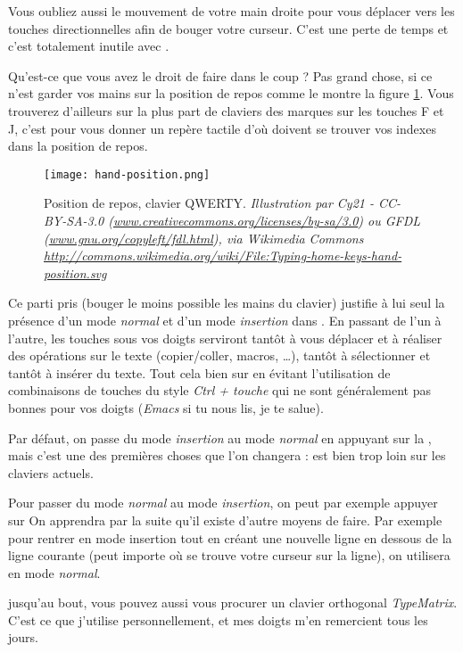 Vous oubliez aussi le mouvement de votre main droite pour vous déplacer vers les touches directionnelles afin de bouger votre curseur. C'est une perte de temps et c'est totalement inutile avec \vim.

Qu'est-ce que vous avez le droit de faire dans le coup ? Pas grand chose, si ce n'est garder vos mains sur la position de repos comme le montre la figure \ref{fig:hand-position}. Vous trouverez d'ailleurs sur la plus part de claviers des marques sur les touches F et J, c'est pour vous donner un repère tactile d'où doivent se trouver vos indexes dans la position de repos.

\begin{figure}%
  \texttt{[image: hand-position.png]}
  \caption{Position de repos, clavier QWERTY. \emph{Illustration par Cy21 - CC-BY-SA-3.0 (\url{www.creativecommons.org/licenses/by-sa/3.0}) ou GFDL (\url{www.gnu.org/copyleft/fdl.html}), via Wikimedia Commons \url{http://commons.wikimedia.org/wiki/File:Typing-home-keys-hand-position.svg}}}
  \label{fig:hand-position}
\end{figure}

Ce parti pris (bouger le moins possible les mains du clavier) justifie à lui seul la présence d'un mode \emph{normal} et d'un mode \emph{insertion} dans \vim. En passant de l'un à l'autre, les touches sous vos doigts serviront tantôt à vous déplacer et à réaliser des opérations sur le texte (copier/coller, macros, \ldots), tantôt à sélectionner et tantôt à insérer du texte. Tout cela bien sur en évitant l'utilisation de combinaisons de touches du style \emph{Ctrl + touche} qui ne sont généralement pas bonnes pour vos doigts (\emph{Emacs} si tu nous lis, je te salue).

Par défaut, on passe du mode \emph{insertion} au mode \emph{normal} en appuyant sur la \ttesc, mais c'est une des premières choses que l'on changera : \ttesc est bien trop loin sur les claviers actuels. 

Pour passer du mode \emph{normal} au mode \emph{insertion}, on peut par exemple appuyer sur \tti On apprendra par la suite qu'il existe d'autre moyens de faire. Par exemple pour rentrer en mode insertion tout en créant une nouvelle ligne en dessous de la ligne courante (peut importe où se trouve votre curseur sur la ligne), on utilisera \tto en mode \emph{normal}.

 jusqu'au bout, vous pouvez aussi vous procurer un clavier orthogonal \emph{TypeMatrix}. C'est ce que j'utilise personnellement, et mes doigts m'en remercient tous les jours.

